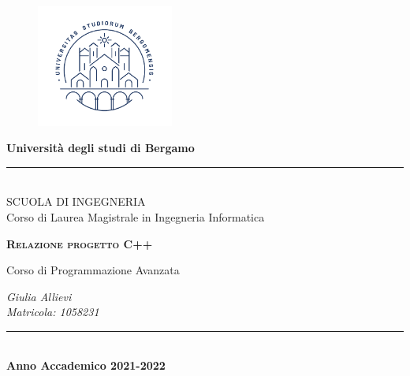 \documentclass[a4paper,12pt]{article}
\newlength{\drop}
\begin{document}
  \begin{titlepage}
    \textheight
    \centering
    \begin{figure}[h]
\centering
\includegraphics[width=4.5cm]{immagini/imgproj}
\end{figure}
    \textbf{Università degli studi di Bergamo}
    \rule{\textwidth}{0.5pt}\\[0.2cm]
   SCUOLA DI INGEGNERIA\\[0.15cm]Corso di Laurea Magistrale in Ingegneria Informatica
   \\[\baselineskip]
    {\scshape
    \vspace*{5.5cm}
    \textbf{\LARGE {Relazione progetto C++\\[0.3cm]}}
    {\Large Corso di Programmazione Avanzata\\[2cm] \par}
    {\large{\itshape Giulia Allievi \\ Matricola: 1058231\par}}
    \vfill
    }
    \rule{\textwidth}{0.5pt}\\[0.5cm]
    
   \normalsize \textbf{Anno Accademico 2021-2022}
  \end{titlepage}
\end{document}

